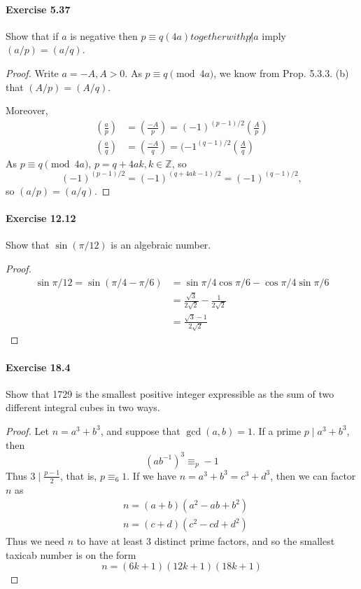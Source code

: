 \documentclass{article}
\begin{document}
\paragraph{Exercise 5.37} Show that if $a$ is negative then $p \equiv q(4 a) together with p\not | a$ imply $(a / p)=(a / q)$.
\begin{proof}    
\newcommand{\legendre}[2]{\genfrac{(}{)}{}{}{#1}{#2}}
Write $a = -A, A>0$. As $p \equiv q \pmod {4a}$, we know from Prop. 5.3.3. (b) that $(A/p) = (A/q)$.

Moreover,
\begin{align*}
\legendre{a}{p}&= \legendre{-A}{p} = (-1)^{(p-1)/2} \legendre{A}{p}\\
\legendre{a}{q}&= \legendre{-A}{q} = (-1^{(q-1)/2} \legendre{A}{q}
\end{align*}
As  $p \equiv q \pmod {4a}$, $ p = q + 4ak, k\in \mathbb{Z}$, so
$$(-1)^{(p-1)/2} = (-1)^{(q+4ak-1)/2} = (-1)^{(q-1)/2},$$
so $(a/p) = (a/q)$.
\end{proof}



\paragraph{Exercise 12.12} Show that $\sin (\pi / 12)$ is an algebraic number.
\begin{proof}
$$
\begin{aligned}
    \sin \pi/12=\sin \left(\pi/4-\pi/6\right) & =\sin \pi/4 \cos \pi/6-\cos \pi/4 \sin \pi/6 \\
& =\frac{\sqrt{3}}{2 \sqrt{2}}-\frac{1}{2 \sqrt{2}} \\
& =\frac{\sqrt{3}-1}{2 \sqrt{2}}
\end{aligned}
$$
\end{proof}

\paragraph{Exercise 18.4} Show that 1729 is the smallest positive integer expressible as the sum of two different integral cubes in two ways.
\begin{proof}
    Let $n=a^3+b^3$, and suppose that $\operatorname{gcd}(a, b)=1$. If a prime $p \mid a^3+b^3$, then
$$
\left(a b^{-1}\right)^3 \equiv_p-1
$$
Thus $3 \mid \frac{p-1}{2}$, that is, $p \equiv_6 1$.
If we have $n=a^3+b^3=c^3+d^3$, then we can factor $n$ as
$$
\begin{aligned}
& n=(a+b)\left(a^2-a b+b^2\right) \\
& n=(c+d)\left(c^2-c d+d^2\right)
\end{aligned}
$$
Thus we need $n$ to have at least 3 distinct prime factors, and so the smallest taxicab number is on the form
$$
n=(6 k+1)(12 k+1)(18 k+1)
$$
\end{proof}
\end{document}
